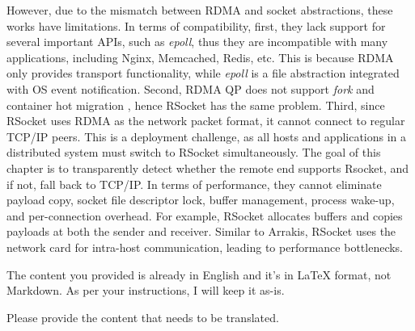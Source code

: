However, due to the mismatch between RDMA and socket abstractions, these works have limitations. 
In terms of compatibility, first, they lack support for several important APIs, such as \textit{epoll}, thus they are incompatible with many applications, including Nginx, Memcached, Redis, etc. 
This is because RDMA only provides transport functionality, while \textit{epoll} is a file abstraction integrated with OS event notification. 
Second, RDMA QP does not support \textit{fork} and container hot migration \cite{nsdi19freeflow}, hence RSocket has the same problem. 
Third, since RSocket uses RDMA as the network packet format, it cannot connect to regular TCP/IP peers. 
This is a deployment challenge, as all hosts and applications in a distributed system must switch to RSocket simultaneously. 
The goal of this chapter is to transparently detect whether the remote end supports Rsocket, and if not, fall back to TCP/IP. 
In terms of performance, they cannot eliminate payload copy, socket file descriptor lock, buffer management, process wake-up, and per-connection overhead. 
For example, RSocket allocates buffers and copies payloads at both the sender and receiver. 
Similar to Arrakis, RSocket uses the network card for intra-host communication, leading to performance bottlenecks.

The content you provided is already in English and it's in LaTeX format, not Markdown. As per your instructions, I will keep it as-is. 

Please provide the content that needs to be translated.

